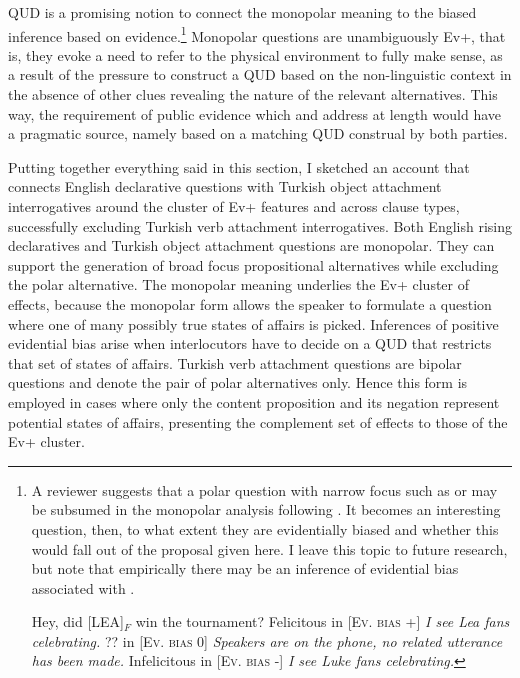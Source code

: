 \documentclass[output=paper,colorlinks,citecolor=brown]{langscibook}
\begin{document}
 QUD is a promising notion to connect the monopolar meaning to the biased inference based on evidence.\footnote{A reviewer suggests that a polar question with narrow focus such as  or  may be subsumed in the monopolar analysis following \citet{krifka14-f}. It becomes an interesting question, then, to what extent they are evidentially biased and whether this would fall out of the proposal given here. I leave this topic to future research, but note that empirically there may be an inference of evidential bias associated with .
 
 \ea\label{tournament} Hey, did [LEA]$_F$ win the tournament?
 \ea Felicitous in \textsc{[Ev. bias +]} \textit{I see Lea fans celebrating.}
 \ex ?? in \textsc{[Ev. bias 0]} \textit{Speakers are on the phone, no related utterance has been made.}
\ex Infelicitous in \textsc{[Ev. bias -]} \textit{I see Luke fans celebrating.}
\z
\z
 } Monopolar questions are unambiguously Ev+, that is, they evoke a need to refer to the physical environment to fully make sense, as a result of the pressure to construct a QUD based on the non-linguistic context in the absence of other clues revealing the nature of the relevant alternatives. This way, the requirement of public evidence which \citet{buring-gunlogson} and \citet{gunlogson} address at length would have a pragmatic source, namely based on a matching QUD construal by both parties. 

  
Putting together everything said in this section, I sketched an account that connects English declarative questions with Turkish object attachment interrogatives around the cluster of Ev+ features and across clause types, successfully excluding Turkish verb attachment interrogatives. Both English rising declaratives and Turkish object attachment questions are monopolar. They can support the generation of broad focus propositional alternatives while excluding the polar alternative. The monopolar meaning underlies the Ev+ cluster of effects, because the monopolar form allows the speaker to formulate a question where one of many possibly true states of affairs is picked. Inferences of positive evidential bias arise when interlocutors have to decide on a QUD that restricts that set of states of affairs. Turkish verb attachment questions are bipolar questions and denote the pair of polar alternatives only. Hence this form is employed in cases where only the content proposition and its negation represent potential states of affairs, presenting the complement set of effects to those of the Ev+ cluster. 
\end{document}
